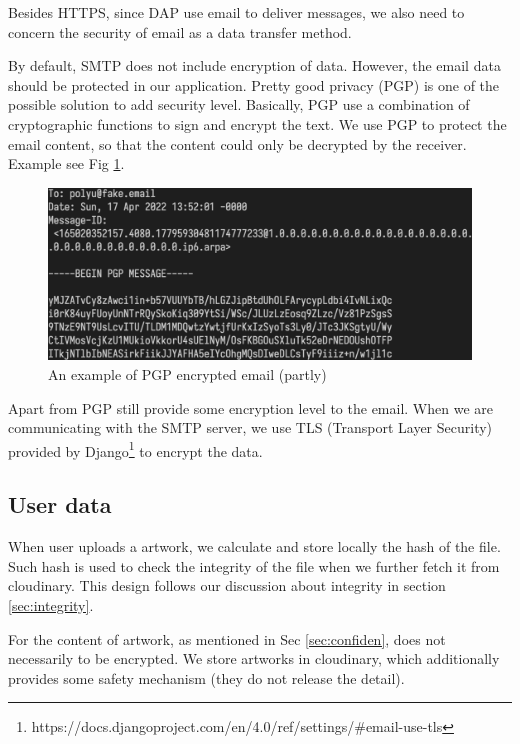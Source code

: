 Besides HTTPS, since DAP use email to deliver messages, we also need to concern the security of email as a data transfer method.  

By default, SMTP does not include encryption of data. However, the email data should be protected in our application. Pretty good privacy (PGP)\cite{network2007openpgp} is one of the possible solution to add security level. Basically, PGP use a combination of cryptographic functions to sign and encrypt the text. We use PGP to protect the email content, so that the content could only be decrypted by the receiver. Example see Fig \ref{fig:pgp}.

\begin{figure}
    \centering
    \includegraphics[scale=0.6]{sections/pgp-ex.png}
    \caption{An example of PGP encrypted email (partly)}
    \label{fig:pgp}
\end{figure}

Apart from PGP still provide some encryption level to the email. When we are communicating with the SMTP server, we use TLS (Transport Layer Security) provided by Django\footnote{ https://docs.djangoproject.com/en/4.0/ref/settings/#email-use-tls} to encrypt the data.
\subsection{User data}


When user uploads a artwork, we calculate and store locally the hash of the file. Such hash is used to check the integrity of the file when we further fetch it from cloudinary. This design follows our discussion about integrity in section \ref{sec:integrity}.

For the content of artwork, as mentioned in Sec \ref{sec:confiden}, does not necessarily to be encrypted. We store artworks in cloudinary, which additionally provides some safety mechanism (they do not release the detail).  

